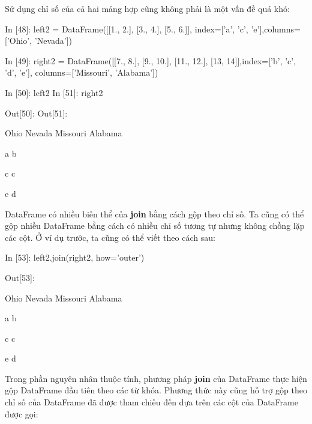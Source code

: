     Sử dụng chỉ số của cả hai mảng hợp cũng không phải là một vấn đề quá khó: \par
     \quad\textup{In [48]: left2 = DataFrame([[1., 2.], [3., 4.], [5., 6.]], index=['a', 'c', 'e'],columns=['Ohio', 'Nevada'])}\par
     \quad\textup{In [49]: right2 = DataFrame([[7., 8.], [9., 10.], [11., 12.], [13, 14]],index=['b', 'c', 'd', 'e'], columns=['Missouri', 'Alabama'])}\par
     \quad\textup{In [50]: left2 \quad\quad\quad\quad\quad In [51]: right2}\par
     \quad\textup{Out[50]: \quad\quad \quad\quad\quad\quad\quad Out[51]:}\par
     \quad \quad  Ohio \quad Nevada \quad\quad\quad\quad \quad\quad Missouri \quad Alabama  \par
     \quad a \quad {} \quad\quad {} \quad\quad\quad\quad b \quad \quad \quad{} \quad \quad \quad{} \par
     \quad c \quad {} \quad\quad {} \quad\quad\quad\quad c \quad \quad \quad{} \quad \quad \quad{} \par
     \quad e \quad {} \quad\quad {} \quad\quad\quad\quad d \quad \quad \quad{} \quad \quad \quad{} \\ \par
    DataFrame có nhiều biến thể của \textbf{join} bằng cách gộp theo chỉ số. Ta cũng có thể gộp nhiều DataFrame bằng cách có nhiều chỉ số tương tự nhưng không chồng lặp các cột. Ở ví dụ trước, ta cũng có thể viết theo cách sau: \\ \par{}
    \quad\textup{In [53]: left2.join(right2, how='outer')}\par
    \quad\textup{Out[53]:}\par
    \quad \quad  Ohio \quad Nevada \quad\quad\quad\quad \quad\quad Missouri \quad Alabama  \par
     \quad a \quad {} \quad\quad {} \quad\quad\quad\quad b \quad \quad \quad{} \quad \quad \quad{} \par
     \quad c \quad {} \quad\quad {} \quad\quad\quad\quad c \quad \quad \quad{} \quad \quad \quad{} \par
     \quad e \quad {} \quad\quad {} \quad\quad\quad\quad d \quad \quad \quad{} \quad \quad \quad{} \\ \par
     Trong phần nguyên nhân thuộc tính, phương pháp \textbf{join} của DataFrame thực hiện gộp DataFrame đầu tiên theo các từ khóa. Phương thức này cũng hỗ trợ gộp theo chỉ số của DataFrame đã được tham chiếu đến dựa trên các cột của DataFrame được gọi: \par
